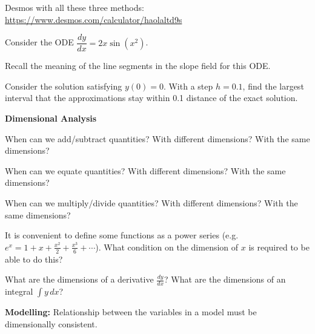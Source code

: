 \documentclass{workbook}
\begin{document}
\begin{slide}



Desmos with all these three methods:
\hfil 
\url{https://www.desmos.com/calculator/haolaltd9s}


Consider the ODE $\dfrac{dy}{dx} = 2x\sin(x^2)$.
\begin{parts}
	\item Recall the meaning of the line segments in the slope field for this ODE.

	\item Consider the solution satisfying $y(0)=0$. With a step $h=0.1$, find the largest interval that the approximations stay within 0.1 distance of the exact solution.

\end{parts}

	
\end{slide}




\begin{slide}

\question 

\textbf{Dimensional Analysis}


\begin{parts}

\item When can we add/subtract quantities? With different dimensions? With the same dimensions?

\item When can we equate quantities? With different dimensions? With the same dimensions?

\item When can we multiply/divide quantities? With different dimensions? With the same dimensions?

\item It is convenient to define some functions as a power series (e.g. $e^x = 1 + x + \frac{x^2}{2} + \frac{x^3}{6}+ \cdots$). What condition on the dimension of $x$ is required to be able to do this?

\item What are the dimensions of a derivative $\frac{dy}{dx}$? What are the dimensions of an integral $\int y \, dx$?
	
\end{parts}

\begin{slidesonly}
	\bigskip
\end{slidesonly}


\textbf{Modelling:} Relationship between the variables in a model must be dimensionally consistent.

\end{slide}
\end{document}
